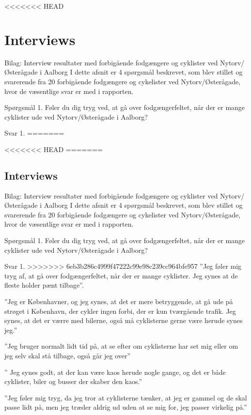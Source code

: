 \appendix
\label{appendix_start}
<<<<<<< HEAD
\begin{appendics}
  \chapter{Interviews}
  \label{chap:interviews}
  Bilag: Interview resultater med forbigående fodgængere og cyklister ved Nytorv/Østerågade i Aalborg
I dette afsnit er 4 spørgsmål beskrevet, som blev stillet og svarerende fra 20 forbigående fodgængere og cykelister ved Nytorv/Østerågade, hvor de væsentlige svar er med i rapporten.

Spørgsmål 1.
Føler du dig tryg ved, at gå over fodgængerfeltet, når der er mange cyklister ude ved Nytorv/Østerågade i Aalborg?

Svar 1.
=======

<<<<<<< HEAD
=======
\begin{appendics}
  \chapter{Interviews}
  \label{chap:interviews}
 Bilag: Interview resultater med forbigående fodgængere og cyklister ved Nytorv/Østerågade i Aalborg 
I dette afsnit er 4 spørgsmål beskrevet, som blev stillet og svarerende fra 20 forbigående fodgængere og cykelister ved Nytorv/Østerågade, hvor de væsentlige svar er med i rapporten.  
 
Spørgsmål 1.  
Føler du dig tryg ved, at gå over fodgængerfeltet, når der er mange cyklister ude ved Nytorv/Østerågade i Aalborg?

Svar 1. 
>>>>>>> 6eb3b286c4999f47222c99e98c239cc964bfe957
”Jeg føler mig tryg af, at gå over fodgængerfeltet, når der er mange cyklister. Jeg synes at de fleste holder pænt tilbage”.

”Jeg er Københavner, og jeg synes, at det er mere betryggende, at gå ude på strøget i København, der cykler ingen forbi, der er kun tværgående trafik. Jeg synes, at det er værre med bilerne, også må cyklisterne gerne være herude synes jeg.”

”Jeg bruger normalt lidt tid på, at se efter om cyklisterne har set mig eller om jeg selv skal stå tilbage, også går jeg over”

” Jeg synes godt, at der kan være kaos herude nogle gange, og det er både cyklister, biler og busser der skaber den kaos.”

”Jeg føler mig tryg, da jeg tror at cyklisterne tænker, at jeg er gammel og de skal passe lidt på, men jeg træder aldrig ud uden at se mig for, jeg passer virkelig på.”


\end{appendics}
\end{appendics}
